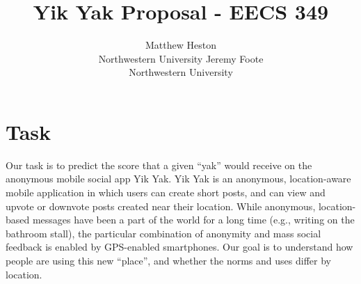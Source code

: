 \documentclass{sigchi}
\begin{document}
\title{Yik Yak Proposal - EECS 349}

\author{
  \alignauthor Matthew Heston\\
  Northwestern University
  \alignauthor Jeremy Foote\\
  Northwestern University
}

\toappear{}
\maketitle



\section{Task}

Our task is to predict the score that a given ``yak'' would receive on the anonymous mobile social app Yik Yak. Yik Yak is an anonymous, location-aware mobile application in which users can create short posts, and can view and upvote or downvote posts created near their location. While anonymous, location-based messages have been a part of the world for a long time (e.g., writing on the bathroom stall), the particular combination of anonymity and mass social feedback is enabled by GPS-enabled smartphones. Our goal is to understand how people are using this new ``place'', and whether the norms and uses differ by location.
\end{document}
